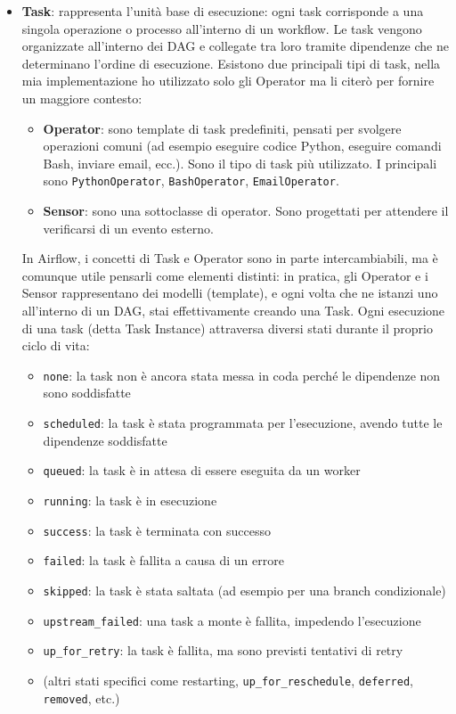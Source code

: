 \begin{itemize}
    \item \textbf{Task}: rappresenta l'unità base di esecuzione: ogni task corrisponde a una singola operazione o processo all'interno di un workflow. Le task vengono organizzate all'interno dei DAG e collegate tra loro tramite dipendenze che ne determinano l'ordine di esecuzione. 
    Esistono due principali tipi di task, nella mia implementazione ho utilizzato solo gli Operator ma li citerò per fornire un maggiore contesto:
    \begin{itemize}
        \item \textbf{Operator}: sono template di task predefiniti, pensati per svolgere operazioni comuni (ad esempio eseguire codice Python, eseguire comandi Bash, inviare email, ecc.). Sono il tipo di task più utilizzato. I principali sono \texttt{PythonOperator}, \texttt{BashOperator}, \texttt{EmailOperator}.
        \item \textbf{Sensor}: sono una sottoclasse di operator. Sono progettati per attendere il verificarsi di un evento esterno.
    \end{itemize}

    In Airflow, i concetti di Task e Operator sono in parte intercambiabili, ma è comunque utile pensarli come elementi distinti: in pratica, gli Operator e i Sensor rappresentano dei modelli (template), e ogni volta che ne istanzi uno all'interno di un DAG, stai effettivamente creando una Task.
    Ogni esecuzione di una task (detta Task Instance) attraversa diversi stati durante il proprio ciclo di vita:
    \begin{itemize}
        \item \texttt{none}: la task non è ancora stata messa in coda perché le dipendenze non sono soddisfatte
        \item \texttt{scheduled}: la task è stata programmata per l'esecuzione, avendo tutte le dipendenze soddisfatte
        \item \texttt{queued}: la task è in attesa di essere eseguita da un worker
        \item \texttt{running}: la task è in esecuzione
        \item \texttt{success}: la task è terminata con successo
        \item \texttt{failed}: la task è fallita a causa di un errore
        \item \texttt{skipped}: la task è stata saltata (ad esempio per una branch condizionale)
        \item \texttt{upstream\_failed}: una task a monte è fallita, impedendo l'esecuzione
        \item \texttt{up\_for\_retry}: la task è fallita, ma sono previsti tentativi di retry
        \item (altri stati specifici come restarting, \texttt{up\_for\_reschedule}, \texttt{deferred}, \texttt{removed}, etc.)
    \end{itemize}
\end{itemize}

